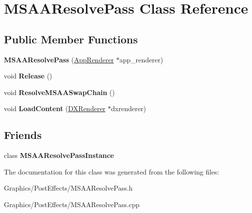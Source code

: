 \hypertarget{classMSAAResolvePass}{}\section{M\+S\+A\+A\+Resolve\+Pass Class Reference}
\label{classMSAAResolvePass}
\subsection*{Public Member Functions}
\begin{DoxyCompactItemize}
\item 
\mbox{\label{classMSAAResolvePass_a815d6d1b017c7bbdfe0a113f7434ee92}} 
{\bfseries M\+S\+A\+A\+Resolve\+Pass} (\hyperlink{classAppRenderer}{App\+Renderer} $\ast$app\+\_\+renderer)
\item 
\mbox{\label{classMSAAResolvePass_a5ca728327a44d06d028187d138720ae6}} 
void {\bfseries Release} ()
\item 
\mbox{\label{classMSAAResolvePass_a1e0ba93ffbf84c69c23fc01dff588f6a}} 
void {\bfseries Resolve\+M\+S\+A\+A\+Swap\+Chain} ()
\item 
\mbox{\label{classMSAAResolvePass_ae5a8e86826e33c7c44c028ef03e44307}} 
void {\bfseries Load\+Content} (\hyperlink{classDXRenderer}{D\+X\+Renderer} $\ast$dxrenderer)
\end{DoxyCompactItemize}
\subsection*{Friends}
\begin{DoxyCompactItemize}
\item 
\mbox{\label{classMSAAResolvePass_af2b4490c4b9be86b986502e67885f591}} 
class {\bfseries M\+S\+A\+A\+Resolve\+Pass\+Instance}
\end{DoxyCompactItemize}


The documentation for this class was generated from the following files\+:\begin{DoxyCompactItemize}
\item 
Graphics/\+Post\+Effects/M\+S\+A\+A\+Resolve\+Pass.\+h\item 
Graphics/\+Post\+Effects/M\+S\+A\+A\+Resolve\+Pass.\+cpp\end{DoxyCompactItemize}
